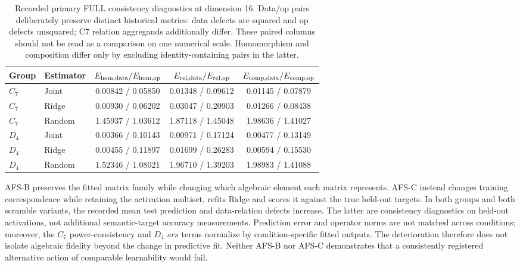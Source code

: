 \begin{table}[h]
\centering
\small
\begin{tabular}{llccc}
\toprule
Group & Estimator & $E_{\mathrm{hom,data}}/E_{\mathrm{hom,op}}$ & $E_{\mathrm{rel,data}}/E_{\mathrm{rel,op}}$ & $E_{\mathrm{comp,data}}/E_{\mathrm{comp,op}}$ \\
\midrule
$C_7$ & Joint & 0.00842 / 0.05850 & 0.01348 / 0.09612 & 0.01145 / 0.07879 \\
$C_7$ & Ridge & 0.00930 / 0.06202 & 0.03047 / 0.20903 & 0.01266 / 0.08438 \\
$C_7$ & Random & 1.45937 / 1.03612 & 1.87118 / 1.45048 & 1.98636 / 1.41027 \\
$D_4$ & Joint & 0.00366 / 0.10143 & 0.00971 / 0.17124 & 0.00477 / 0.13149 \\
$D_4$ & Ridge & 0.00455 / 0.11897 & 0.01699 / 0.26283 & 0.00594 / 0.15530 \\
$D_4$ & Random & 1.52346 / 1.08021 & 1.96710 / 1.39203 & 1.98983 / 1.41088 \\
\bottomrule
\end{tabular}
\caption{Recorded primary FULL consistency diagnostics at dimension 16. Data/op pairs deliberately preserve distinct historical metrics: data defects are squared and op defects unsquared; C7 relation aggregands additionally differ. These paired columns should not be read as a comparison on one numerical scale. Homomorphism and composition differ only by excluding identity-containing pairs in the latter.}
\label{tab:full-diagnostics}
\end{table}


AFS-B preserves the fitted matrix family while changing which algebraic element each matrix represents. AFS-C instead changes training correspondence while retaining the activation multiset, refits Ridge and scores it against the true held-out targets. In both groups and both scramble variants, the recorded mean test prediction and data-relation defects increase. The latter are consistency diagnostics on held-out activations, not additional semantic-target accuracy measurements. Prediction error and operator norms are not matched across conditions; moreover, the $C_7$ power-consistency and $D_4$ $srs$ terms normalize by condition-specific fitted outputs. The deterioration therefore does not isolate algebraic fidelity beyond the change in predictive fit. Neither AFS-B nor AFS-C demonstrates that a consistently registered alternative action of comparable learnability would fail.

